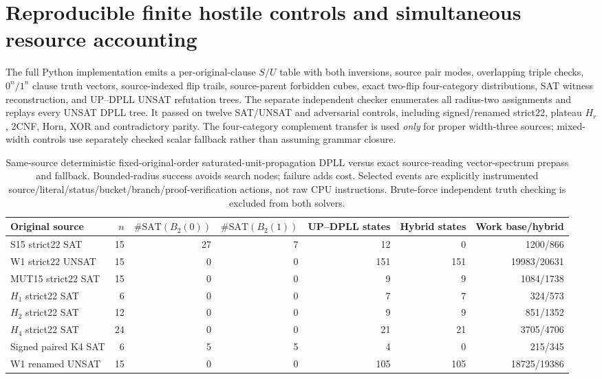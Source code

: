 \documentclass[10pt]{article}
\begin{document}
\section{Reproducible finite hostile controls and simultaneous resource accounting}
The full Python implementation emits a per-original-clause $S/U$ table with both inversions, source pair modes, overlapping triple checks, $0^n/1^n$ clause truth vectors, source-indexed flip trails, source-parent forbidden cubes, exact two-flip four-category distributions, SAT witness reconstruction, and UP--DPLL UNSAT refutation trees. The separate independent checker enumerates all radius-two assignments and replays every UNSAT DPLL tree. It passed on twelve SAT/UNSAT and adversarial controls, including signed/renamed strict22, plateau $H_r$, 2CNF, Horn, XOR and contradictory parity. The four-category complement transfer is used \emph{only} for proper width-three sources; mixed-width controls use separately checked scalar fallback rather than assuming grammar closure.

\begin{table}[ht]\centering\small
\begin{tabular}{lrrrrrr}
\toprule
Original source & $n$ & $\#\mathrm{SAT}(B_2(0))$ & $\#\mathrm{SAT}(B_2(1))$ & UP--DPLL states & Hybrid states & Work base/hybrid\\
\midrule
S15 strict22 SAT &15&27&7&12&0&1200/866\\
W1 strict22 UNSAT &15&0&0&151&151&19983/20631\\
MUT15 strict22 SAT &15&0&0&9&9&1084/1738\\
$H_1$ strict22 SAT &6&0&0&7&7&324/573\\
$H_2$ strict22 SAT &12&0&0&9&9&851/1352\\
$H_4$ strict22 SAT &24&0&0&21&21&3705/4706\\
Signed paired K4 SAT &6&5&5&4&0&215/345\\
W1 renamed UNSAT &15&0&0&105&105&18725/19386\\
\bottomrule
\end{tabular}
\caption{Same-source deterministic fixed-original-order saturated-unit-propagation DPLL versus exact source-reading vector-spectrum prepass and fallback. Bounded-radius success avoids search nodes; failure adds cost. Selected events are explicitly instrumented source/literal/status/bucket/branch/proof-verification actions, not raw CPU instructions. Brute-force independent truth checking is excluded from both solvers.}
\end{table}
\end{document}
